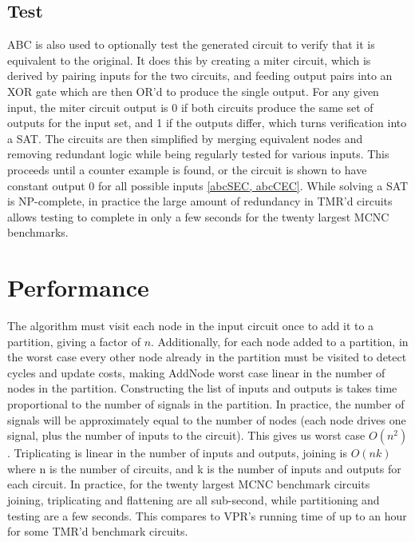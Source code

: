 \documentclass[12pt,final,oneside]{dwThesis} %
\begin{document}
   \subsection{Test}\label{algTest}
   \gls{ABC} is also used to optionally test the generated circuit to verify that it is equivalent to the original. It does this by creating a miter circuit, which is derived by pairing inputs for the two circuits, and feeding output pairs into an XOR gate which are then OR'd to produce the single output. For any given input, the miter circuit output is 0 if both circuits produce the same set of outputs for the input set, and 1 if the outputs differ, which turns verification into a \gls{SAT}.
   The circuits are then simplified by merging equivalent nodes and removing redundant logic while being regularly tested for various inputs. This proceeds until a counter example is found, or the circuit is shown to have constant output 0 for all possible inputs \ref{abcSEC, abcCEC}.
   While solving a \gls{SAT} is NP-complete, in practice the large amount of redundancy in \gls{TMR}'d circuits allows testing to complete in only a few seconds for the twenty largest \gls{MCNC} benchmarks.

   \section{Performance}
   The algorithm must visit each node in the input circuit once to add it to a partition, giving a factor of $n$.
   Additionally, for each node added to a partition, in the worst case every other node already in the partition must be visited to detect cycles and update costs, making AddNode worst case linear in the number of nodes in the partition.
   Constructing the list of inputs and outputs is takes time proportional to the number of signals in the partition. In practice, the number of signals will be approximately equal to the number of nodes (each node drives one signal, plus the number of inputs to the circuit).
   This gives us worst case $O(n^2)$.
   Triplicating is linear in the number of inputs and outputs, joining is $O(nk)$ where n is the number of circuits, and k is the number of inputs and outputs for each circuit. 
   In practice, for the twenty largest \gls{MCNC} benchmark circuits joining, triplicating and flattening are all sub-second, while partitioning and testing are a few seconds. This compares to \gls{VPR}'s running time of up to an hour for some \gls{TMR}'d benchmark circuits.
   
\end{document}

